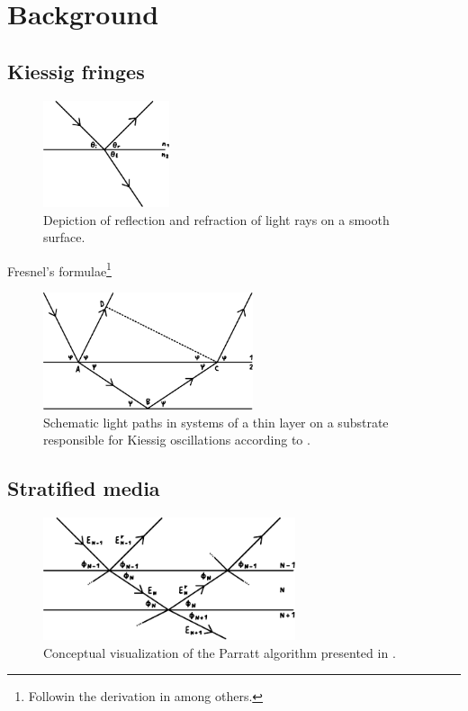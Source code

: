 \section{Background}


\cite{xray}


\subsection{Kiessig fringes}

\begin{figure}
	\centering
	\includegraphics[width=0.33\textwidth]{content/graphics/fresnel.pdf}
	\caption{Depiction of reflection and refraction of light rays on a smooth surface.}
	\label{fig:fresnel}
\end{figure}

Fresnel's formulae\footnote{Followin the derivation in \cite{idfk} among others.}

\cite{Kiessig_1931}

\begin{figure}
	\centering
	\includegraphics[width=0.55\textwidth]{content/graphics/kiessig.pdf}
	\caption{Schematic light paths in systems of a thin layer on a substrate responsible for Kiessig oscillations according to \cite{Kiessig_1931}.}
	\label{fig:kiessig}
\end{figure}


\subsection{Stratified media}

\cite{Parratt_1954}

\begin{figure}
	\centering
	\includegraphics[width=0.66\textwidth]{content/graphics/parratt.pdf}
	\caption{Conceptual visualization of the Parratt algorithm presented in \cite{Parratt_1954}.}
	\label{fig:parratt}
\end{figure}
